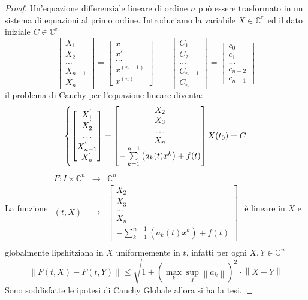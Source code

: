 \begin{proof}
	Un'equazione differenziale lineare di ordine $n$ può essere trasformato in un sistema di equazioni al primo ordine.
	Introduciamo la variabile $X\in\mathbb{C^n}$ ed il dato iniziale $C\in\mathbb{C^n}$
	$$\left[\begin{matrix} X_1\\X_2\\\ldots\\X_{n-1}\\X_n \end{matrix}\right] = \left[\begin{matrix} x\\ x'\\\ldots\\ x^{(n-1)}\\x^{(n)} \end{matrix}\right]\quad\quad\left[\begin{matrix} C_1\\C_2\\\ldots\\C_{n-1}\\C_{n} \end{matrix}\right] = \left[\begin{matrix} c_0\\c_1\\\ldots\\ c_{n-2}\\c_{n-1} \end{matrix}\right]$$
	il problema di Cauchy per l'equazione lineare diventa:
	$$
	\left\{
	\left[\begin{matrix} X_1^{'}\\X_2^{'}\\\ldots\\X_{n-1}^{'}\\X_n^{'} \end{matrix}\right]
	=
	\left[\begin{matrix} X_2\\X_3\\\ldots\\X_{n}\\-\sum\limits_{k=1}^{n-1}\left(a_k(t)x^k\right)+f(t) \end{matrix}\right]
	\\
	X(t_0)=C
	\right.
	$$
	La funzione
	$\begin{array}{rcl} 
	F: I\times\mathbb{C}^n & \to & \mathbb{C}^n \\
	   (t,X) & \to & \left[\begin{matrix} X_2\\X_3\\\ldots\\X_{n}\\-\sum\limits_{k=1}^{n-1}\left(a_k(t)x^k\right)+f(t) \end{matrix}\right] \\ 
	\end{array}$
	è lineare in $X$ e globalmente lipshitziana in $X$ uniformemente in $t$, infatti per ogni $X,Y\in\mathbb{C}^n$
	$$\left\|F(t,X)-F(t,Y)\right\|\le \sqrt{1+\left( \max\limits_k \sup\limits_I \left\|a_k\right\| \right)^2}\cdot\left\|X-Y\right\|$$
	Sono soddisfatte le ipotesi di Cauchy Globale allora si ha la tesi.
\end{proof}
